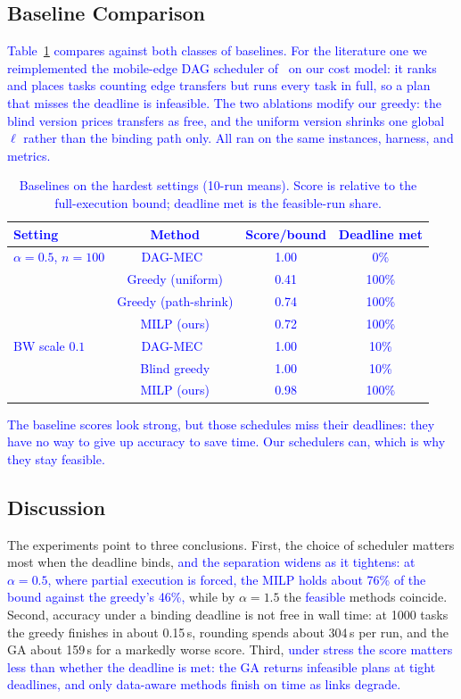 \documentclass[conference]{IEEEtran}
\newcommand{\rev}[1]{\textcolor{blue}{#1}}%
\begin{document}
\subsection{Baseline Comparison}

\rev{Table~\ref{tab:baselines} compares against both classes of baselines. For the literature one we reimplemented the mobile-edge DAG scheduler of~\cite{li2023dagmec} on our cost model: it ranks and places tasks counting edge transfers but runs every task in full, so a plan that misses the deadline is infeasible. The two ablations modify our greedy: the blind version prices transfers as free, and the uniform version shrinks one global $\ell$ rather than the binding path only. All ran on the same instances, harness, and metrics.}

\begin{table}[t]
\caption{Baselines on the hardest settings (10-run means). Score is
relative to the full-execution bound; deadline met is the
feasible-run share.}
\label{tab:baselines}
\centering\scriptsize
\rev{\begin{tabular}{lccc}
\toprule
Setting & Method & Score/bound & Deadline met\\
\midrule
$\alpha{=}0.5$, $n{=}100$ & DAG-MEC~\cite{li2023dagmec} & 1.00 & 0\%\\
 & Greedy (uniform) & 0.41 & 100\%\\
 & Greedy (path-shrink) & 0.74 & 100\%\\
 & MILP (ours) & 0.72 & 100\%\\
\midrule
BW scale $0.1$ & DAG-MEC~\cite{li2023dagmec} & 1.00 & 10\%\\
 & Blind greedy & 1.00 & 10\%\\
 & MILP (ours) & 0.98 & 100\%\\
\bottomrule
\end{tabular}}
\end{table}

\rev{The baseline scores look strong, but those schedules miss their deadlines: they have no way to give up accuracy to save time. Our schedulers can, which is why they stay feasible.}

\subsection{Discussion}

The experiments point to three conclusions. First, the choice of
scheduler matters most when the deadline binds, \rev{and the separation
widens as it tightens: at $\alpha{=}0.5$, where partial execution is
forced, the MILP holds about 76\% of the bound against the greedy's
46\%,} while by $\alpha{=}1.5$ the \rev{feasible} methods coincide. Second,
accuracy under a binding deadline is not free in wall time: at 1000
tasks the greedy finishes in about 0.15\,s, rounding spends about
304\,s per run, and the GA about 159\,s for a markedly worse score.
Third, \rev{under stress the score matters less than whether the deadline is met: the GA returns infeasible plans at tight deadlines, and only data-aware methods finish on time as links degrade.}
\end{document}
